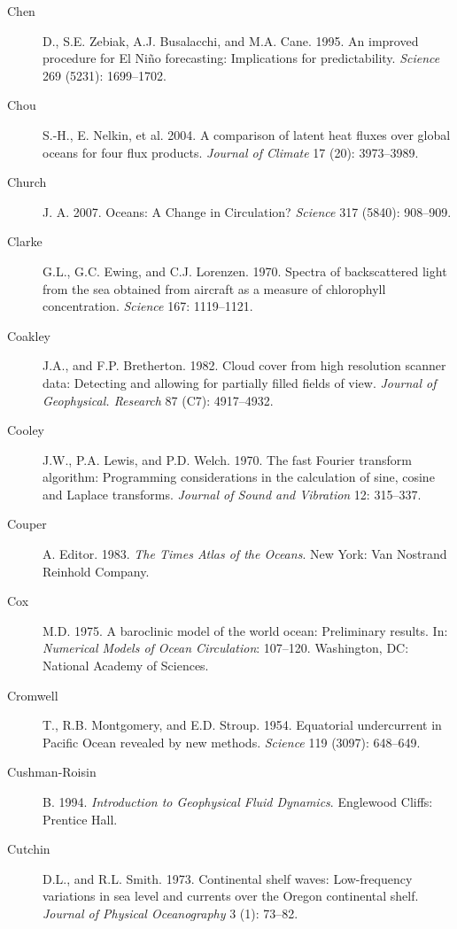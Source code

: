 \begin{description}
\item [Chen]D., S.E. Zebiak, A.J. Busalacchi, and M.A. Cane. 1995. An
  improved procedure for El Ni\~{n}o forecasting: Implications for
  predictability.  \textit{Science} 269 (5231): 1699--1702.

\item [Chou]S.-H., E. Nelkin, et al. 2004. A comparison of latent heat
  fluxes over global oceans for four flux products. \textit{Journal of
    Climate} 17 (20): 3973--3989.

\item [Church]J. A. 2007. Oceans: A Change in Circulation?
  \textit{Science} 317 (5840): 908--909.
	
\item [Clarke]G.L., G.C. Ewing, and C.J. Lorenzen. 1970. Spectra of
  backscattered light from the sea obtained from aircraft as a measure
  of chlorophyll concentration. \textit{Science} 167: 1119--1121.

\item [Coakley]J.A., and F.P. Bretherton. 1982. Cloud cover from high
  resolution scanner data: Detecting and allowing for partially filled
  fields of view. \textit{Journal of Geophysical. Research} 87 (C7):
  4917--4932.

\item [Cooley]J.W., P.A. Lewis, and P.D. Welch. 1970. The fast Fourier
  transform algorithm: Programming considerations in the calculation
  of sine, cosine and Laplace transforms. \textit{Journal of Sound and
    Vibration} 12: 315--337.

\item [Couper]A. Editor. 1983. \textit{The Times Atlas of the
  Oceans}. New York: Van Nostrand Reinhold Company.

\item [Cox]M.D. 1975. A baroclinic model of the world ocean:
  Preliminary results. In: \textit{Numerical Models of Ocean
    Circulation}: 107--120. Washington, DC: National Academy of
  Sciences.

\item [Cromwell]T., R.B. Montgomery, and E.D. Stroup. 1954. Equatorial
  undercurrent in Pacific Ocean revealed by new
  methods. \textit{Science} 119 (3097): 648--649.

\item[Cushman-Roisin]B. 1994. \textit{Introduction to Geophysical
  Fluid Dynamics}.  Englewood Cliffs: Prentice Hall.

\item[Cutchin]D.L., and R.L. Smith. 1973. Continental shelf waves:
  Low-frequency variations in sea level and currents over the Oregon
  continental shelf. \textit{Journal of Physical Oceanography} 3 (1):
  73--82.


\end{description}
